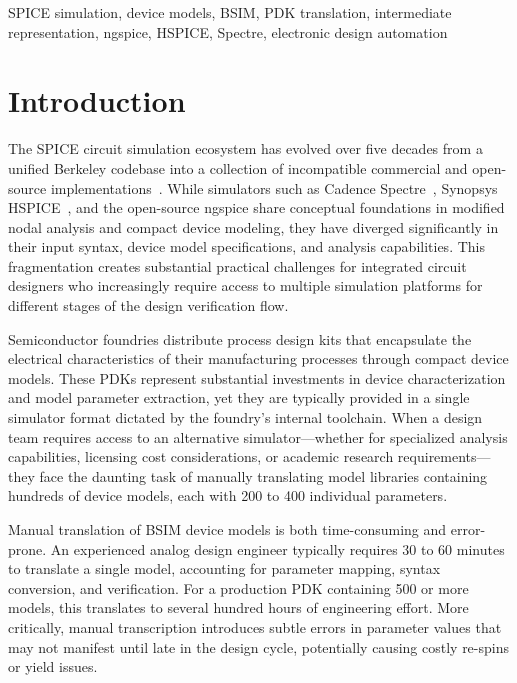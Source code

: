 \documentclass[conference]{IEEEtran}
\begin{document}
\begin{IEEEkeywords}
SPICE simulation, device models, BSIM, PDK translation, intermediate representation, ngspice, HSPICE, Spectre, electronic design automation
\end{IEEEkeywords}

\section{Introduction}

The SPICE circuit simulation ecosystem has evolved over five decades from a unified Berkeley codebase into a collection of incompatible commercial and open-source implementations~\cite{ngspice}. While simulators such as Cadence Spectre~\cite{spectre}, Synopsys HSPICE~\cite{hspice}, and the open-source ngspice share conceptual foundations in modified nodal analysis and compact device modeling, they have diverged significantly in their input syntax, device model specifications, and analysis capabilities. This fragmentation creates substantial practical challenges for integrated circuit designers who increasingly require access to multiple simulation platforms for different stages of the design verification flow.

Semiconductor foundries distribute process design kits that encapsulate the electrical characteristics of their manufacturing processes through compact device models. These PDKs represent substantial investments in device characterization and model parameter extraction, yet they are typically provided in a single simulator format dictated by the foundry's internal toolchain. When a design team requires access to an alternative simulator---whether for specialized analysis capabilities, licensing cost considerations, or academic research requirements---they face the daunting task of manually translating model libraries containing hundreds of device models, each with 200 to 400 individual parameters.

Manual translation of BSIM device models is both time-consuming and error-prone. An experienced analog design engineer typically requires 30 to 60 minutes to translate a single model, accounting for parameter mapping, syntax conversion, and verification. For a production PDK containing 500 or more models, this translates to several hundred hours of engineering effort. More critically, manual transcription introduces subtle errors in parameter values that may not manifest until late in the design cycle, potentially causing costly re-spins or yield issues.
\end{document}
